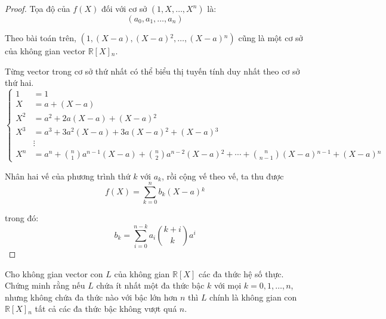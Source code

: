 \documentclass[class=linear-algebra,crop=false]{standalone}
\begin{document}
\begin{proof}Tọa độ của $f(X)$ đối với cơ sở $(1, X, \ldots, X^{n})$ là:
    \[ (a_{0}, a_{1}, \ldots, a_{n}) \]
    \par Theo bài toán trên, $(1, (X - a), (X - a){}^{2}, \ldots, (X - a){}^{n})$ cũng là một cơ sở của không gian vector $\mathbb{R}[X]{}_{n}$.
    \par Từng vector trong cơ sở thứ nhất có thể biểu thị tuyến tính duy nhất theo cơ sở thứ hai.
    \[
        \begin{cases}
            1     & = 1                                                                                                                      \\
            X     & = a + (X-a)                                                                                                              \\
            X^{2} & = a^{2} + 2a(X-a) + (X-a){}^{2}                                                                                          \\
            X^{3} & = a^{3} + 3a^{2}(X-a) + 3a(X-a){}^{2} + (X-a){}^{3}                                                                      \\
                  & \vdots                                                                                                                   \\
            X^{n} & = a^{n} + \binom{n}{1}a^{n-1}(X-a) + \binom{n}{2}a^{n-2}(X-a){}^{2} + \cdots + \binom{n}{n-1}(X-a){}^{n-1} + (X-a){}^{n}
        \end{cases}
    \]
    \par Nhân hai vế của phương trình thứ $k$ với $a_{k}$, rồi cộng vế theo vế, ta thu được
    \[
        f(X) = \sum^{n}_{k=0}b_{k}(X-a){}^{k}
    \]
    \par trong đó:
    \[
        b_{k} = \sum^{n-k}_{i=0}a_{i}\binom{k+i}{k}a^{i}
    \]
\end{proof}

\begin{exercise}Cho không gian vector con $L$ của không gian $\mathbb{R}[X]$ các đa thức hệ số thực. Chứng minh rằng nếu $L$ chứa ít nhất một đa thức bậc $k$ với mọi $k = 0, 1,\ldots, n$, nhưng không chứa đa thức nào với bậc lớn hơn $n$ thì $L$ chính là không gian con $\mathbb{R}[X]{}_{n}$ tất cả các đa thức bậc không vượt quá $n$.
\end{exercise}
\end{document}
